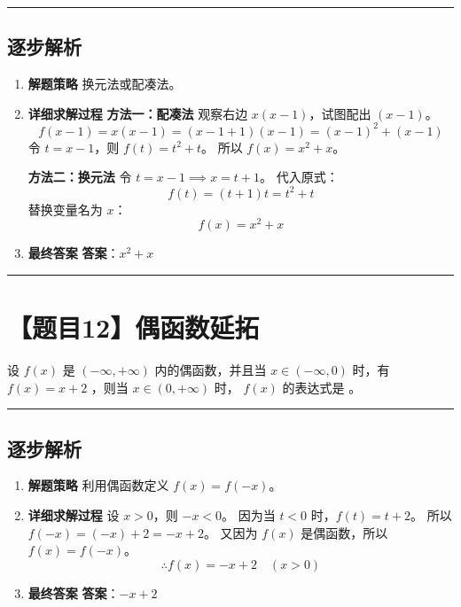 \documentclass[UTF8]{ctexart}
\newenvironment{redenv}{\color{red}}{}
\newenvironment{detailedanalysis}{%
    \color{red}
    \begin{enumerate}[label=\textbf{第\arabic*步：}, leftmargin=*, align=left, itemsep=1.5ex]
}{%
    \end{enumerate}
}
\newcommand{\problemrule}{\noindent\rule{\textwidth}{1.5pt}\vspace{-0.8em}}
\newcommand{\analysisrule}{\noindent\rule{\textwidth}{0.8pt}\vspace{-0.8em}}
\newcommand{\blank}[1]{\underline{\hspace{#1}}}
\begin{document}
\begin{redenv}
\analysisrule
\subsection*{逐步解析}

\begin{detailedanalysis}
\item \textbf{解题策略}
换元法或配凑法。

\item \textbf{详细求解过程}
\textbf{方法一：配凑法}
观察右边 $x(x-1)$，试图配出 $(x-1)$。
$$ f(x-1) = x(x-1) = (x-1+1)(x-1) = (x-1)^2 + (x-1) $$
令 $t = x-1$，则 $f(t) = t^2 + t$。
所以 $f(x) = x^2 + x$。

\textbf{方法二：换元法}
令 $t = x-1 \implies x = t+1$。
代入原式：
$$ f(t) = (t+1)t = t^2 + t $$
替换变量名为 $x$：
$$ f(x) = x^2 + x $$

\item \textbf{最终答案}
\textbf{答案}：$ x^2 + x $
\end{detailedanalysis}
\end{redenv}

\problemrule
\section*{【题目12】偶函数延拓}
设 $ f(x) $ 是 $ (-\infty, +\infty) $ 内的偶函数，并且当 $ x \in (-\infty, 0) $ 时，有 $ f(x) = x + 2 $ ，则当 $ x \in (0, +\infty) $ 时， $ f(x) $ 的表达式是 \blank{2cm}。

\begin{redenv}
\analysisrule
\subsection*{逐步解析}

\begin{detailedanalysis}
\item \textbf{解题策略}
利用偶函数定义 $f(x) = f(-x)$。

\item \textbf{详细求解过程}
设 $x > 0$，则 $-x < 0$。
因为当 $t < 0$ 时，$f(t) = t + 2$。
所以 $f(-x) = (-x) + 2 = -x + 2$。
又因为 $f(x)$ 是偶函数，所以 $f(x) = f(-x)$。
$$ \therefore f(x) = -x + 2 \quad (x>0) $$

\item \textbf{最终答案}
\textbf{答案}：$ -x+2 $
\end{detailedanalysis}
\end{redenv}
\end{document}
